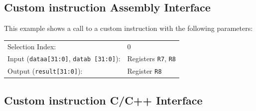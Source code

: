	\subsection{Custom instruction Assembly Interface}
		This example shows a call to a custom instruction with the following parameters:
	
		\begin{table}[H]\centering
			\begin{tabular}{ll}
				Selection Index: 
					& 0\\
				Input (\texttt{dataa[31:0]}, \texttt{datab [31:0]}): 
					& Registers \texttt{R7}, \texttt{R8}\\
				Output (\texttt{result[31:0]}): 
					& Register \texttt{R8}\\
			\end{tabular}
		\end{table}
		
		

	\subsection{Custom instruction C/C++ Interface}
		